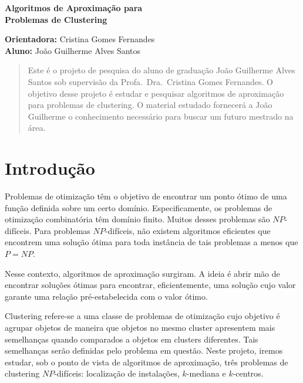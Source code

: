 \documentclass[12pt]{article}
\newcommand{\NP}{\mathit{NP}}
\begin{document}
\begin{center}
  
{\Large {\bf Algoritmos de Aproximação para \\Problemas de Clustering}
}

\vspace{0.2cm}
{\small 
{\bf Orientadora:} Cristina Gomes Fernandes \\
{\bf Aluno:} João Guilherme Alves Santos
}

\vspace{5mm} 

\begin{abstract}
Este é o projeto de pesquisa do aluno de graduação João Guilherme Alves Santos sob supervisão da Profa.\ Dra.\ Cristina Gomes Fernandes. O objetivo desse projeto é estudar e pesquisar algoritmos de aproximação para problemas de clustering. O material estudado fornecerá a João Guilherme o conhecimento necessário para buscar um futuro mestrado na área.
\end{abstract}

\end{center}
\newpage

\tableofcontents

\newpage

\section{Introdução}

Problemas de otimização têm o objetivo de encontrar um ponto ótimo de uma função definida sobre um certo domínio. Especificamente, os problemas de otimização combinatória têm domínio finito. Muitos desses problemas são $\NP$-difíceis. Para problemas $\NP$-difíceis, não existem algoritmos eficientes que encontrem uma solução ótima para toda instância de tais problemas a menos que $P = \NP$.

Nesse contexto, algoritmos de aproximação surgiram. A ideia é abrir mão de encontrar soluções ótimas para encontrar, eficientemente, uma solução cujo valor garante uma relação pré-estabelecida com o valor ótimo. 

Clustering refere-se a uma classe de problemas de otimização cujo objetivo é agrupar objetos de maneira que objetos no mesmo cluster apresentem mais semelhanças quando comparados a objetos em clusters diferentes. Tais semelhanças serão definidas pelo problema em questão. Neste projeto, iremos estudar, sob o ponto de vista de algoritmos de aproximação, três problemas de clustering $\NP$-difíceis: localização de instalações, $k$-mediana e $k$-centros. 
\end{document}
